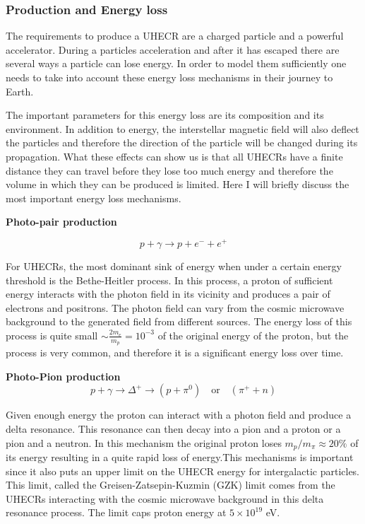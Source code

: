 
\subsubsection{Production and Energy loss}
The requirements to produce a UHECR are a charged particle and a powerful accelerator. During a particles acceleration and after it has escaped there are several ways a particle can lose energy.
In order to model them sufficiently one needs to take into account these energy loss mechanisms in their journey to Earth. 

The important parameters for this energy loss are its composition and its environment. In addition to energy, the interstellar magnetic field will also deflect the particles and therefore the direction of the particle will be changed during its propagation. 
What these effects can show us is that all UHECRs have a finite distance they can travel before they lose too much energy and therefore the volume in which they can be produced is limited.
Here I will briefly discuss the most important energy loss mechanisms.

\textbf{Photo-pair production}

\begin{equation}
    p + \gamma \rightarrow p + e^- + e^+
\end{equation}

For UHECRs, the most dominant sink of energy when under a certain energy threshold is the Bethe-Heitler process. In this process, a proton of sufficient energy interacts with the 
photon field in its vicinity and produces a pair of electrons and positrons. The photon field can vary from the cosmic microwave background to the generated field from different sources. 
The energy loss of this process is quite small $\sim \frac{2m_e}{m_p}= 10^{-3}$ of the original energy of the proton, but the process is very common, and therefore it is a significant energy loss over time.


\textbf{Photo-Pion production }
\begin{equation}
    p + \gamma \rightarrow \Delta^+ \rightarrow (p + \pi^0)\quad \text{or} \quad (\pi^+ + n)
    \label{eq:delta_resonance}
\end{equation}

Given enough energy the proton can interact with a photon field and produce a delta resonance. This resonance can then decay into a pion and a proton or a pion and a neutron. In this mechanism the original proton loses $m_p/m_\pi \approx 20\% $ of its energy resulting in a quite rapid loss of energy.This mechanisms is important since it also puts an upper limit on the UHECR energy for intergalactic particles. 
This limit, called the Greisen-Zatsepin-Kuzmin (GZK) limit comes from the UHECRs interacting with the cosmic microwave background in this delta resonance process. The limit caps proton energy at $5\times 10^{19}$ eV.



